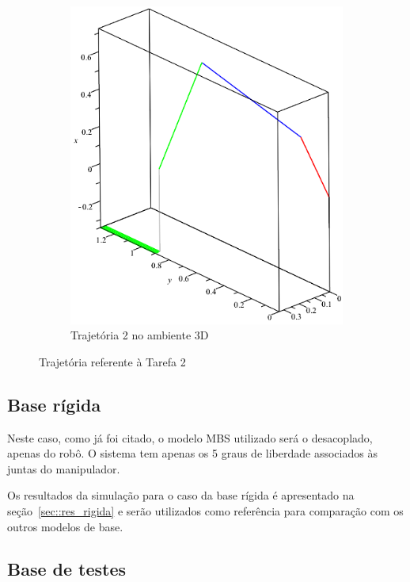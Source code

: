 \begin{figure}[h!]
\begin{subfigure}[b]{0.4\textwidth}
        \includegraphics[width=\textwidth]{figs/traj2_3d}
        \caption{Trajetória 2 no ambiente 3D}
        \label{fig::traj2_3d}
    \end{subfigure}
    \caption{Trajetória referente à Tarefa 2}
    \label{fig::traj2_subf}
\end{figure}


\subsection{Base rígida}

Neste caso, como já foi citado, o modelo MBS utilizado será o desacoplado,
apenas do robô. O sistema tem apenas os 5 graus de liberdade associados às juntas do
manipulador.

Os resultados da simulação para o caso da base rígida é apresentado na
seção~\ref{sec::res_rigida} e serão utilizados como referência para comparação
com os outros modelos de base.


\subsection{Base de testes}

